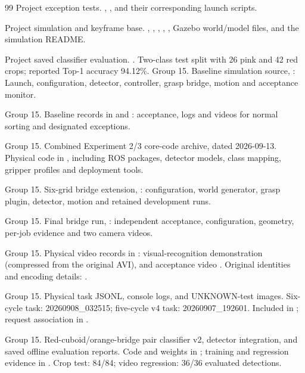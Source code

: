\begin{thebibliography}{99}
Project exception tests. , , and their corresponding  launch scripts.

Project simulation and keyframe base. , , , , , Gazebo world/model files, and the simulation README.

Project saved classifier evaluation. . Two-class test split with 26 pink and 42 red crops; reported Top-1 accuracy 94.12\%.
Group 15. Baseline simulation source, : Launch, configuration, detector, controller, grasp bridge, motion and acceptance monitor.

Group 15. Baseline records in  and : acceptance, logs and videos for normal sorting and designated exceptions.

Group 15. Combined Experiment 2/3 core-code archive, dated 2026-09-13. Physical code in , including ROS packages, detector models, class mapping, gripper profiles and deployment tools.

Group 15. Six-grid bridge extension, : configuration, world generator, grasp plugin, detector, motion and retained development runs.

Group 15. Final bridge run, : independent acceptance, configuration, geometry, per-job evidence and two camera videos.

Group 15. Physical video records in : visual-recognition demonstration  (compressed from the original AVI), and acceptance video . Original identities and encoding details: .

Group 15. Physical task JSONL, console logs, and UNKNOWN-test images. Six-cycle task: 20260908\_032515; five-cycle v4 task: 20260907\_192601. Included in ; request association in .

Group 15. Red-cuboid/orange-bridge pair classifier v2, detector integration, and saved offline evaluation reports. Code and weights in ; training and regression evidence in . Crop test: 84/84; video regression: 36/36 evaluated detections.

\end{thebibliography}

